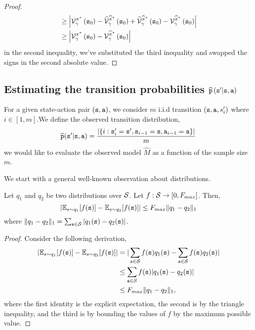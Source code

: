 \begin{proof}
\begin{align*}
& \geq\left|\mathcal{V}_{\gamma}^{\pi^{*}}\left({\tt s}_{0}\right)-{\widehat{\mathcal{V}}_{\gamma}^{\widehat{\pi}^{*}}\left({\tt s}_{0}\right)}+{\widehat{\mathcal{V}}_{\gamma}^{\widehat{\pi}^{*}}\left({\tt s}_{0}\right)}-\mathcal{V}_{\gamma}^{\widehat{\pi}^{*}}\left({\tt s}_{0}\right)\right|\\
& \geq\left|\mathcal{V}_{\gamma}^{\pi^{*}}\left({\tt s}_{0}\right)-\mathcal{V}_{\gamma}^{\widehat{\pi}^{*}}\left({\tt s}_{0}\right)\right|
\end{align*}
in the second inequality, we've substituted the third inequality
and swapped the signs in the second absolute value. 
\end{proof}

\subsection{Estimating the transition probabilities $\widehat{{\tt p}}\left({\tt s}'|{\tt s},{\tt a}\right)$}

For a given state-action pair $\left({\tt s},{\tt a}\right)$, we consider $m$
i.i.d transition $\left({\tt s},{\tt a},s'_{i}\right)$ where $i\in\left[1,m\right]$.We
define the observed transition distribution,
\[
\widehat{{\tt p}}({\tt s}'|{\tt s},{\tt a})=\frac{|\{i:{\tt s}'_i={\tt s}',{\tt s}_{i-1}={\tt s},{\tt a}_{i-1}={\tt a}\}|}{m}
\]
we would like to evaluate the observed model $\widehat{M}$ as a function
of the sample size $m$.


We start with a general well-known observation about distributions.

\begin{theorem}
\label{thm:dist-l1} Let $q_1$ and $q_2$ be two distributions over
$\mathcal{S}$. Let $f:\mathcal{S} \rightarrow [0,F_{max}]$. Then,
\[
|\mathbb{E}_{s\sim q_1}[f({\tt s})]- \mathbb{E}_{s\sim q_2}[f({\tt s})]|\leq F_{max}
\|q_1-q_2\|_1
\]
where $\|q_1-q_2\|_1=\sum_{{\tt s} \in \mathcal{S}}
|q_1({\tt s})-q_2({\tt s})|$.
\end{theorem}

\begin{proof} Consider the following derivation,
\begin{align*} |\mathbb{E}_{s\sim q_1}[f({\tt s})]- \mathbb{E}_{s\sim q_2}[f({\tt s})]|
&=|\sum_{{\tt s} \in \mathcal{S}} f({\tt s})q_1({\tt s}) - \sum_{{\tt s} \in \mathcal{S}} f({\tt s})q_2({\tt s})| \\
&\leq \sum_{{\tt s} \in \mathcal{S}} f({\tt s})|q_1({\tt s}) - q_2({\tt s})|\\
 &\leq F_{max} \|q_1-q_2\|_1,
\end{align*}
where the first identity is the explicit expectation, the second is by the triangle inequality, and the third is by bounding the values of $f$ by the maximum possible value.
\end{proof}

